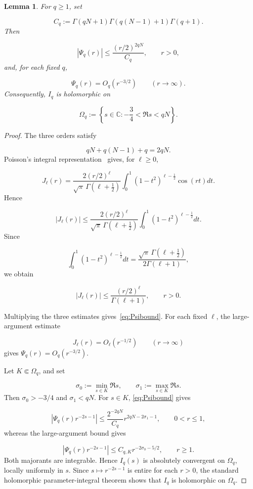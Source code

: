 \documentclass[11pt]{article}
\theoremstyle{plain}
\newtheorem{lemma}[theorem]{Lemma}
\theoremstyle{definition}
\theoremstyle{remark}
\begin{document}
\begin{lemma}\label{res:3.3}
For $q \ge 1$, set

\[
  C_q := \Gamma (qN+1) \Gamma (q(N-1)+1) \Gamma (q+1) .
\]
Then

\begin{equation}\label{eq:Psibound}
  |\Psi_q(r)| \le \frac{(r/2)^{2qN}}{C_q} , \qquad  r > 0 ,
\end{equation}
and, for each fixed $q$,

\[
  \Psi_q(r) = O_q(r^{-3/2}) \qquad  (r \to \infty ) .
\]
Consequently, $I_q$ is holomorphic on

\[
  \Omega_q := \left\{ s \in \mathbb{C} : -\frac{3}{4} < \Re s < qN \right\} .
\]
\end{lemma}

\begin{proof}
The three orders satisfy

\[
  qN + q(N-1) + q = 2qN .
\]
Poisson's integral representation~\cite[Eq.~10.9.4]{r1} gives, for $\ell \ge 0$,

\[
  J_\ell (r) = \frac{2(r/2)^\ell }{\sqrt{\pi }\, \Gamma (\ell + \tfrac{1}{2})} \int_{0}^{1} (1-t^{2})^{\ell - \frac{1}{2}} \cos (rt) dt .
\]
Hence

\[
  |J_\ell (r)| \le \frac{2(r/2)^\ell }{\sqrt{\pi }\, \Gamma (\ell + \tfrac{1}{2})} \int_{0}^{1} (1-t^{2})^{\ell - \frac{1}{2}} dt .
\]
Since

\[
  \int_{0}^{1} (1-t^{2})^{\ell - \frac{1}{2}} dt = \frac{\sqrt{\pi }\, \Gamma (\ell + \tfrac{1}{2})}{2\Gamma (\ell +1)} ,
\]
we obtain

\[
  |J_\ell (r)| \le \frac{(r/2)^\ell }{\Gamma (\ell +1)} , \qquad  r > 0 .
\]

Multiplying the three estimates gives~\eqref{eq:Psibound}. For each fixed $\ell$, the large-argument estimate~\cite[Eq.~10.17.3]{r1}

\[
  J_\ell (r) = O_\ell (r^{-1/2}) \qquad  (r \to \infty )
\]
gives $\Psi_q(r) = O_q(r^{-3/2})$.

Let $K \Subset \Omega_q$, and set

\[
  \sigma_{0} := \min_{s \in K} \Re s , \qquad  \sigma_{1} := \max_{s \in K} \Re s .
\]
Then $\sigma_{0} > -3/4$ and $\sigma_{1} < qN$. For $s \in K$, \eqref{eq:Psibound} gives

\[
  \left| \Psi_q(r) r^{-2s-1} \right| \le \frac{2^{-2qN}}{C_q} r^{2qN - 2\sigma_{1} - 1} , \qquad  0 < r \le 1 ,
\]
whereas the large-argument bound gives

\[
  \left| \Psi_q(r) r^{-2s-1} \right| \le C_{q,K} r^{-2\sigma_{0} - 5/2} , \qquad  r \ge 1 .
\]
Both majorants are integrable. Hence $I_q(s)$ is absolutely convergent on $\Omega_q$, locally uniformly in $s$. Since $s \mapsto r^{-2s-1}$ is entire for each $r > 0$, the standard holomorphic parameter-integral theorem shows that $I_q$ is holomorphic on $\Omega_q$.
\end{proof}
\end{document}
